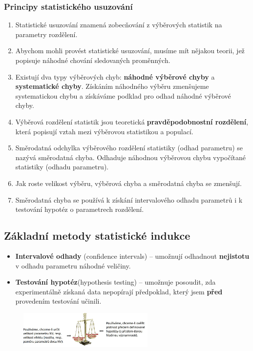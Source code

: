 \subsubsection{Principy statistického usuzování}
\begin{enumerate}
	\item Statistické usuzování znamená zobecňování z výběrových statistik na parametry rozdělení.
	\item Abychom mohli provést statistické usuzování, musíme mít nějakou teorii, jež popisuje náhodné chování sledovaných proměnných.
	\item Existují dva typy výběrových chyb: \textbf{náhodné výběrové chyby} a \textbf{systematické chyby}. Získáním náhodného výběru zmenšujeme systematickou chybu a získáváme podklad pro odhad náhodné výběrové chyby.
	\item Výběrová rozdělení statistik jsou teoretická \textbf{pravděpodobnostní rozdělení}, která popisují vztah mezi výběrovou statistikou a populací.
	\item Směrodatná odchylka výběrového rozdělení statistiky (odhad parametru) se nazývá směrodatná chyba. Odhaduje náhodnou výběrovou chybu vypočítané statistiky (odhadu parametru).
	\item Jak roste velikost výběru, výběrová chyba a směrodatná chyba se zmenšují.
	\item Směrodatná chyba se používá k získání intervalového odhadu parametrů i k testování hypotéz o parametrech rozdělení.
\end{enumerate}
\subsection{Základní metody statistické indukce}
\begin{itemize}
	\item \textbf{Intervalové odhady} (confidence intervals) -- umožnují odhadnout \textbf{nejistotu} v odhadu parametru náhodné veličiny.
	\item \textbf{Testování hypotéz}(hypothesis testing) -- umožnuje posoudit, zda experimentálně získaná data nepopírají předpoklad, který jsem \textbf{před} provedením testování učinili.
\end{itemize}
\begin{figure}[H]
\centering
\includegraphics[width=0.6\textwidth]{assets/14_metody_stat_ind}
\end{figure}
